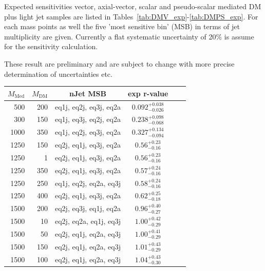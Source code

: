 \clearpage


Expected sensitivities vector, axial-vector, scalar and pseudo-scalar mediated DM plus light jet samples are listed in Tables~\ref{tab:DMV_exp}-\ref{tab:DMPS_exp}. For each mass points as well the five 'most sensitive bin' (MSB) in terms of jet multiplicity are given. Currently a flat systematic uncertainty of 20\% is assume for the sensitivity calculation.

These result are preliminary and are subject to change with more precise determination of uncertainties etc.
\begin{table}
  \centering
  \begin{tabular}{rrcccc}
    \hline\hline
    $M_{\text{Med}}$ & $M_{\text{DM}}$ & nJet MSB & exp r-value \\
    \hline
      500 & 200 & eq1j, eq2j, eq3j, eq2a & $0.092_{-0.026}^{+0.038}$ \\ %
      300 & 150 & eq1j, eq3j, eq2j, eq2a & $0.238_{-0.068}^{+0.098}$ \\ %
     1000 & 350 & eq1j, eq2j, eq3j, eq2a & $0.327_{-0.094}^{+0.134}$ \\ %
     1250 & 150 & eq2j, eq1j, eq3j, eq2a & $0.56_{-0.16}^{+0.23}$    \\ %
     1250 &   1 & eq2j, eq1j, eq3j, eq2a & $0.56_{-0.16}^{+0.23}$    \\ %
     1250 & 350 & eq2j, eq1j, eq3j, eq2a & $0.57_{-0.16}^{+0.24}$    \\ %
     1250 & 250 & eq1j, eq2j, eq2a, eq3j & $0.58_{-0.16}^{+0.24}$    \\ %
     1250 & 400 & eq2j, eq1j, eq3j, eq2a & $0.62_{-0.18}^{+0.25}$    \\ %
     1500 & 200 & eq2j, eq3j, eq1j, eq2a & $0.96_{-0.27}^{+0.40}$    \\ %
     1500 &  10 & eq2j, eq2a, eq1j, eq3j & $1.00_{-0.29}^{+0.42}$    \\ %
     1500 &  50 & eq2j, eq1j, eq2a, eq3j & $1.00_{-0.29}^{+0.41}$    \\ %
     1500 & 150 & eq2j, eq1j, eq2a, eq3j & $1.01_{-0.29}^{+0.43}$    \\ %
     1500 & 100 & eq2j, eq1j, eq2a, eq3j & $1.04_{-0.30}^{+0.43}$    \\ %
    

\end{tabular}
\end{table}
